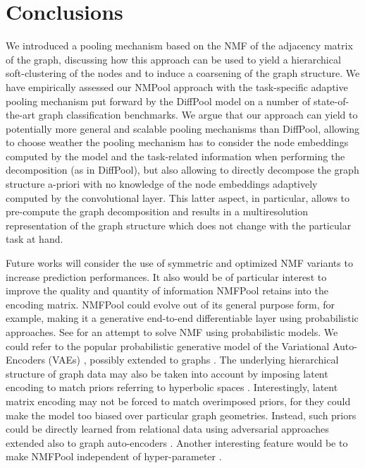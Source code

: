 \documentclass[runningheads]{llncs}
\begin{document}
\section{Conclusions}
We introduced a pooling mechanism based on the NMF of the adjacency matrix of the graph, discussing how this approach can be used to yield a hierarchical soft-clustering of the nodes and to induce a coarsening of the graph structure.  We have empirically assessed our NMPool approach with the task-specific adaptive pooling mechanism put forward by the DiffPool model on a number of state-of-the-art graph classification benchmarks. We argue that our approach can yield to potentially more general and scalable
pooling mechanisms than DiffPool, allowing to choose weather the pooling mechanism has to consider the node embeddings computed by the model and the task-related information when performing the decomposition (as in DiffPool), but also allowing to directly decompose the graph structure a-priori with no knowledge of the node embeddings adaptively computed by the convolutional layer. This latter aspect, in particular, allows to pre-compute the graph decomposition and results in a multiresolution representation of the graph structure which does not change with the particular task at hand.

Future works will consider the use of symmetric and optimized NMF variants to increase prediction performances. It also would be of particular interest to improve the quality and quantity of information NMFPool retains into the encoding matrix. NMFPool could evolve out of its general purpose form, for example, making it a generative end-to-end differentiable layer using probabilistic approaches. See \cite{bayesian-nmf-lio} for an attempt to solve NMF using probabilistic models. We could refer to the popular probabilistic generative model of the Variational Auto-Encoders (VAEs) \cite{2013arXiv1312.6114K}, \cite{pmlr-v32-rezende14} possibly extended to graphs \cite{2016arXiv161107308K}. The underlying hierarchical structure of graph data may also be taken into account by imposing latent encoding to match priors referring to hyperbolic spaces \cite{2019arXiv190106033M}. Interestingly, latent matrix encoding may not be forced to match overimposed priors, for they could make the model too biased over particular graph geometries. Instead, such priors could be directly learned from relational data using adversarial approaches \cite{DBLP:journals/corr/MeschederNG17} extended also to graph auto-encoders \cite{DBLP:journals/corr/abs-1802-04407}. Another interesting feature would be to make NMFPool independent of hyper-parameter .
\end{document}
